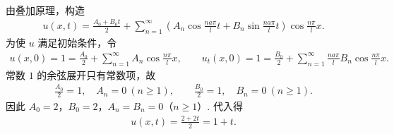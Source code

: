 \documentclass[../../main.tex]{subfiles}%
\begin{document}
\begin{solution}
\begin{enumerate}[(1)]
\begin{align*}
\end{align*}
由叠加原理，构造
\begin{align*}
u(x,t)=\frac{A_0+B_0t}{2}+\sum_{n=1}^{\infty}\left(A_n\cos\frac{na\pi}{l}t+B_n\sin\frac{na\pi}{l}t\right)\cos\frac{n\pi}{l}x.
\end{align*}
为使 $u$ 满足初始条件，令
\begin{align*}
u(x,0)=1=\frac{A_0}{2}+\sum_{n=1}^{\infty}A_n\cos\frac{n\pi}{l}x,\qquad
u_t(x,0)=1=\frac{B_0}{2}+\sum_{n=1}^{\infty}\frac{na\pi}{l}B_n\cos\frac{n\pi}{l}x.
\end{align*}
常数 $1$ 的余弦展开只有常数项，故
\begin{align*}
\frac{A_0}{2}=1,\quad A_n=0\ (n\geqslant 1),\qquad
\frac{B_0}{2}=1,\quad B_n=0\ (n\geqslant 1).
\end{align*}
因此 $A_0=2$，$B_0=2$，$A_n=B_n=0$（$n\geqslant 1$）.
代入得
\begin{align*}
u(x,t)=\frac{2+2t}{2}=1+t.
\end{align*}


\end{enumerate}
\end{solution}
\end{document}
